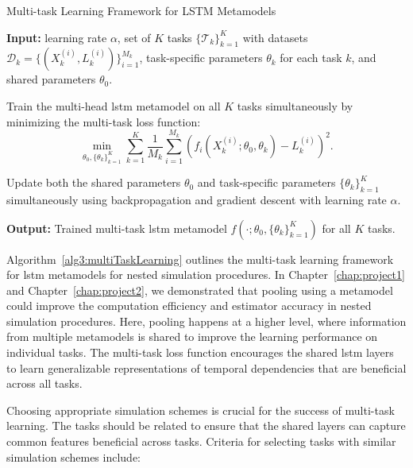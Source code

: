 \begin{algorithm}
    \caption{Multi-task Learning Framework for LSTM Metamodels}
    \begin{algorithmic}[1] \label{alg3:multiTaskLearning}
        \STATE \textbf{Input:} learning rate $\alpha$, set of $K$ tasks $\{\mathcal{T}_k\}_{k=1}^K$ with datasets $\mathcal{D}_k = \{(X_k^{(i)}, L_k^{(i)})\}_{i=1}^{M_k}$, task-specific parameters $\theta_k$ for each task $k$, and shared parameters $\theta_0$.
    
        \STATE Train the multi-head \gls{lstm} metamodel on all $K$ tasks simultaneously by minimizing the multi-task loss function:
        \begin{equation} \label{eq3:multiTaskLoss}
            \min_{\theta_0, \{\theta_k\}_{k=1}^K} \sum_{k=1}^K \frac{1}{M_k} \sum_{i=1}^{M_k} \left( f_i(X_k^{(i)}; \theta_0, \theta_k) - L_k^{(i)} \right)^2.
        \end{equation}
    
        \STATE Update both the shared parameters $\theta_0$ and task-specific parameters $\{\theta_k\}_{k=1}^K$ simultaneously using backpropagation and gradient descent with learning rate $\alpha$.
        
        \STATE \textbf{Output:} Trained multi-task \gls{lstm} metamodel $f(\cdot; \theta_0, \{\theta_k\}_{k=1}^K)$ for all $K$ tasks.
    \end{algorithmic}
\end{algorithm}

Algorithm~\ref{alg3:multiTaskLearning} outlines the multi-task learning framework for \gls{lstm} metamodels for nested simulation procedures.
In Chapter~\ref{chap:project1} and Chapter~\ref{chap:project2}, we demonstrated that pooling using a metamodel could improve the computation efficiency and estimator accuracy in nested simulation procedures.
Here, pooling happens at a higher level, where information from multiple metamodels is shared to improve the learning performance on individual tasks.
The multi-task loss function encourages the shared \gls{lstm} layers to learn generalizable representations of temporal dependencies that are beneficial across all tasks.

Choosing appropriate simulation schemes is crucial for the success of multi-task learning. 
The tasks should be related to ensure that the shared layers can capture common features beneficial across tasks. 
Criteria for selecting tasks with similar simulation schemes include:

